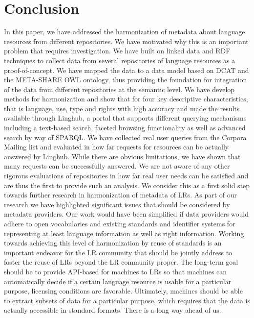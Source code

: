 \documentclass[smallextended]{svjour3}       %
\begin{document}
\section{Conclusion}
\label{conclusion}

In this paper, we have addressed the harmonization of metadata about language
resources from different repositories. We have motivated why this is an
important problem that requires investigation.  We have built on linked data and
RDF techniques to collect data from several repositories of language resources
as a proof-of-concept. We have mapped the data to a data model based on DCAT and
the META-SHARE OWL ontology, thus providing the foundation for integration of
the data from different repositories at the semantic level. We have develop
methods for harmonization and show that for four key descriptive
characteristics, that is language, use, type and rights with high accuracy and 
made the results available through Linghub, a portal that supports
different querying mechanisms including a text-based search, faceted browsing
functionality as well as advanced search by way of SPARQL\@.  We have collected
real user queries from the Corpora Mailing list and evaluated in how far
requests for resources can be actually answered by Linghub. While there are
obvious limitations, we have shown that many requests can be successfully
answered.  We are not aware of any other rigorous evaluations of repositories in
how far real user needs can be satisfied and are thus the first to provide such
an analysis. We consider this as a first solid step towards further research in
harmonization of metadata of LRs. As part of our research we have highlighted
significant issues that should be considered by metadata providers. Our work
would have been simplified if data providers would adhere to open vocabularies
and existing standards and identifier systems for representing at least language
information as well as right information. Working towards achieving this level
of harmonization by reuse of standards is an important endeavor for the LR
community that should be jointly address to foster the reuse of LRs beyond the
LR community proper. The long-term goal should be to provide API-based for
machines to LRs so that machines can automatically decide if a certain language
resource is usable for a particular purpose, licensing conditions are favorable.
Ultimately, machines should be able to extract subsets of data for a particular
purpose, which requires that the data is actually accessible in standard
formats. There is a long way ahead of us.  
\end{document}
